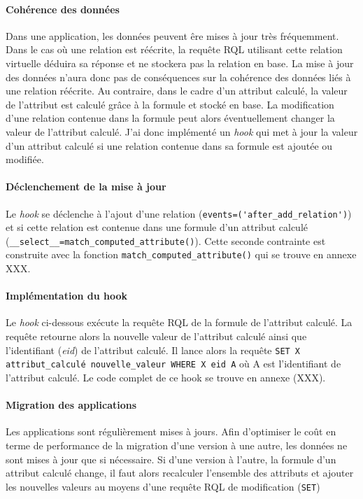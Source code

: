 \documentclass {report}
\begin{document}
\paragraph{Cohérence des données}
Dans une application, les données peuvent êre mises à jour très fréquemment. Dans le cas où une relation est réécrite, la requête RQL utilisant cette relation virtuelle déduira sa réponse et ne stockera pas la relation en base. La mise à jour des données n'aura donc pas de conséquences sur la cohérence des données liés à une relation réécrite. Au contraire, dans le cadre d'un attribut calculé, la valeur de l'attribut est calculé grâce à la formule et stocké en base. La modification d'une relation contenue dans la formule peut alors éventuellement changer la valeur de l'attribut calculé. J'ai donc implémenté un \textit{hook} qui met à jour la valeur d'un attribut calculé si une relation contenue dans sa formule est ajoutée ou modifiée.


\paragraph{Déclenchement de la mise à jour}
Le \textit{hook} se déclenche à l'ajout d'une relation (\verb+events=('after_add_relation')+) et si cette relation est contenue dans une formule d'un attribut calculé (\verb+__select__=match_computed_attribute()+). Cette seconde contrainte est construite avec la fonction \verb+match_computed_attribute()+ qui se trouve en annexe XXX.


\paragraph{Implémentation du hook}
Le \textit{hook} ci-dessous exécute la requête RQL de la formule de l'attribut calculé. La requête retourne alors la nouvelle valeur de l'attribut calculé ainsi que l'identifiant (\textit{eid}) de l'attribut calculé. Il lance alors la requête \verb+SET X attribut_calculé nouvelle_valeur WHERE X eid A+ où A est l'identifiant de l'attribut calculé. Le code complet de ce hook se trouve en annexe (XXX).

\paragraph{Migration des applications}
Les applications sont régulièrement mises à jours. Afin d'optimiser le coût en terme de performance de la migration d'une version à une autre, les données ne sont mises à jour que si nécessaire. Si d'une version à l'autre, la formule d'un attribut calculé change, il faut alors recalculer l'ensemble des attributs et ajouter les nouvelles valeurs au moyens d'une requête RQL de modification (\verb+SET+)
\end{document}
